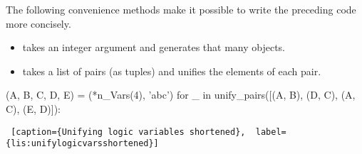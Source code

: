 The following convenience methods make it possible to write the preceding code more concisely.
\begin{itemize}
    \item {} takes an integer argument and generates that many  objects.
    \item {} takes a list of pairs (as tuples) and unifies the elements of each pair.
\end{itemize}

\begin{minipage}{\linewidth} \largev   \hrulefill
\begin{python}
(A, B, C, D, E) = (*n_Vars(4), 'abc')
for _ in unify_pairs([(A, B), (D, C), (A, C), (E, D)]):
\end{python}
\begin{lstlisting} [caption={Unifying logic variables shortened},  label={lis:unifylogicvarsshortened}]
\end{lstlisting}
\end{minipage}

\smallv

\smallv


